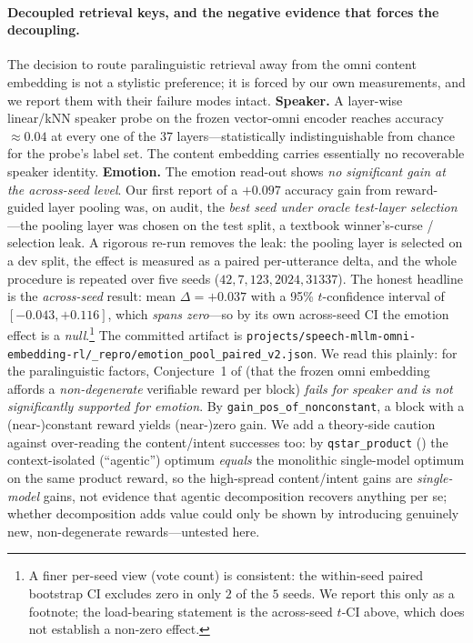 \paragraph{Decoupled retrieval keys, and the negative evidence that forces the decoupling.} The decision to route paralinguistic retrieval away from the omni content embedding is not a stylistic preference; it is forced by our own measurements, and we report them with their failure modes intact. \textbf{Speaker.} A layer-wise linear/kNN speaker probe on the frozen vector-omni encoder reaches accuracy $\approx 0.04$ at every one of the 37 layers---statistically indistinguishable from chance for the probe's label set. The content embedding carries essentially no recoverable speaker identity. \textbf{Emotion.} The emotion read-out shows \emph{no significant gain at the across-seed level}. Our first report of a $+0.097$ accuracy gain from reward-guided layer pooling was, on audit, the \emph{best seed under oracle test-layer selection}---the pooling layer was chosen on the test split, a textbook winner's-curse / selection leak. A rigorous re-run removes the leak: the pooling layer is selected on a dev split, the effect is measured as a paired per-utterance delta, and the whole procedure is repeated over five seeds ($42, 7, 123, 2024, 31337$). The honest headline is the \emph{across-seed} result: mean $\Delta = +0.037$ with a 95\% $t$-confidence interval of $[-0.043, +0.116]$, which \emph{spans zero}---so by its own across-seed CI the emotion effect is a \emph{null}.\footnote{A finer per-seed view (vote count) is consistent: the within-seed paired bootstrap CI excludes zero in only $2$ of the $5$ seeds. We report this only as a footnote; the load-bearing statement is the across-seed $t$-CI above, which does not establish a non-zero effect.} The committed artifact is \texttt{projects/speech-mllm-omni-embedding-rl/\_repro/emotion\_pool\_paired\_v2.json}. We read this plainly: for the paralinguistic factors, Conjecture~1 of  (that the frozen omni embedding affords a \emph{non-degenerate} verifiable reward per block) \emph{fails for speaker and is not significantly supported for emotion}. By \texttt{gain\_pos\_of\_nonconstant}, a block with a (near-)constant reward yields (near-)zero gain. We add a theory-side caution against over-reading the content/intent successes too: by \texttt{qstar\_product} () the context-isolated (``agentic'') optimum \emph{equals} the monolithic single-model optimum on the same product reward, so the high-spread content/intent gains are \emph{single-model} gains, not evidence that agentic decomposition recovers anything per se; whether decomposition adds value could only be shown by introducing genuinely new, non-degenerate rewards---untested here.

